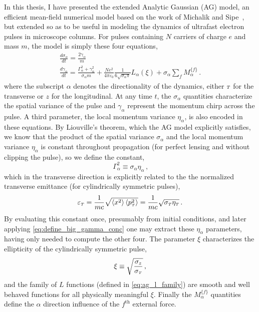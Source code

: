 In this thesis, I have presented the extended Analytic Gaussian (AG) model, an efficient mean-field numerical model based on the work of Michalik and Sipe~\cite{michalik_analytic_2006}, but extended so as to be useful in modeling the dynamics of ultrafast electron pulses in microscope columns.
For pulses containing $N$ carriers of charge $e$ and mass $m$, the model is simply these four equations,
\begin{subequations}
\begin{gather}
  \frac{d\sigma_{\alpha}}{dt} = \frac{2\gamma_{\alpha}}{m} \\
  \frac{d\gamma_{\alpha}}{dt} = \frac{ \Gamma_{\alpha}^2 + \gamma_{\alpha}^2 }{\sigma_{\alpha} m}
    + \frac{N e^2}{4\pi\varepsilon_0} \frac{1}{6 \sqrt{\sigma_{\alpha}\pi}} L_{\alpha}(\xi) + \sigma_{\alpha} \sum\limits_{f} M_{\alpha}^{\lbrace f \rbrace} \label{eq:ag_model_gamma_conc} \,\text{.}
\end{gather}
\end{subequations}
where the subscript $\alpha$ denotes the directionality of the dynamics, either ${\scriptscriptstyle T}$ for the transverse or $z$ for the longitudinal.
At any time $t$, the $\sigma_{\alpha}$ quantities characterize the spatial variance of the pulse and $\gamma_{\alpha}$ represent the momentum chirp across the pulse.
A third parameter, the local momentum variance $\eta_{\alpha}$, is also encoded in these equations.
By Liouville's theorem, which the AG model explicitly satisfies, we know that the product of the spatial variance $\sigma_{\alpha}$ and the local momentum variance $\eta_{\alpha}$ is constant throughout propagation (for perfect lensing and without clipping the pulse), so we define the constant,
\begin{equation} \label{eq:define_big_gamma_conc}
  \Gamma_{\alpha}^2 \equiv \sigma_{\alpha} \eta_{\alpha} \,\text{,}
\end{equation}
which in the transverse direction is explicitly related to the the normalized transverse emittance (for cylindrically symmetric pulses),
\begin{equation}
  \varepsilon_{{\scriptscriptstyle T}} = \frac{1}{m c} \sqrt{ \left < x^2 \right > \left < p_{{\scriptscriptstyle T}}^2 \right > } = \frac{1}{m c} \sqrt{ \sigma_{{\scriptscriptstyle T}} \eta_{{\scriptscriptstyle T}} } \,\text{.}
\end{equation}
By evaluating this constant once, presumably from initial conditions, and later applying \ref{eq:define_big_gamma_conc} one may extract these $\eta_{\alpha}$ parameters, having only needed to compute the other four.
The parameter $\xi$ characterizes the ellipticity of the cylindrically symmetric pulse,
\begin{equation}
  \xi \equiv \sqrt{\dfrac{\sigma_{z}}{\sigma_{{\scriptscriptstyle T}}}} \,\text{,}
\end{equation}
and the family of $L$ functions (defined in \ref{eq:ag_l_family}) are smooth and well behaved functions for all physically meaningful $\xi$.
Finally the $M_{\alpha}^{\lbrace f \rbrace}$ quantities define the $\alpha$ direction influence of the $f^{\text{th}}$ external force.

